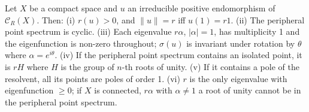 Let $X$ be a compact space and $u$ an irreducible positive endomorphism of $\mathcal{C}_R(X)$. Then: (i) $r(u) > 0$, and $\|u\| = r$ iff $u(1) = r1$. (ii) The peripheral point spectrum is cyclic. (iii) Each eigenvalue $r\alpha$, $|\alpha| = 1$, has multiplicity 1 and the eigenfunction is non-zero throughout; $\sigma(u)$ is invariant under rotation by $\theta$ where $\alpha = e^{i\theta}$. (iv) If the peripheral point spectrum contains an isolated point, it is $rH$ where $H$ is the group of $n$-th roots of unity. (v) If it contains a pole of the resolvent, all its points are poles of order 1. (vi) $r$ is the only eigenvalue with eigenfunction $\geq 0$; if $X$ is connected, $r\alpha$ with $\alpha \neq 1$ a root of unity cannot be in the peripheral point spectrum.
